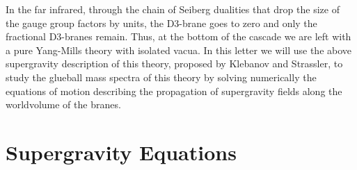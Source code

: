 \documentclass[12pt,epsf,a4paper]{article}
\begin{document}
In the far infrared, through the chain of Seiberg dualities that drop the size of the 
gauge group factors by \coordHE{} units, the D3-brane  goes to  zero and  
only the \coordHE{} fractional D3-branes remain. Thus, at the bottom of the cascade we are left 
with a pure \coordHE{} Yang-Mills theory 
with \coordHE{} isolated vacua. In this letter we will use the above 
supergravity description of this theory, proposed by Klebanov and Strassler, to study the 
glueball mass spectra of this theory by solving numerically the equations of motion describing 
the propagation of supergravity fields along the worldvolume of the branes.




\section{Supergravity Equations}
\end{document}
